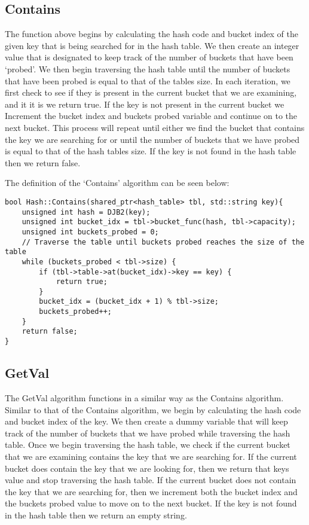 \subsection*{Contains}

The function above begins by calculating the hash code and bucket index of the given key that is being searched for in the hash table. We then create an integer value that is designated
to keep track of the number of buckets that have been `probed'. We then begin traversing the hash table until the number of buckets that have been probed is equal to that of the tables
size. In each iteration, we first check to see if they is present in the current bucket that we are examining, and it it is we return true. If the key is not present in the current bucket
we Increment the bucket index and buckets probed variable and continue on to the next bucket. This process will repeat until either we find the bucket that contains the key we are searching
for or until the number of buckets that we have probed is equal to that of the hash tables size. If the key is not found in the hash table then we return false.

\begin{highlight}

The definition of the `Contains' algorithm can be seen below:

\horizontalline

\begin{verbatim}
bool Hash::Contains(shared_ptr<hash_table> tbl, std::string key){
    unsigned int hash = DJB2(key);
    unsigned int bucket_idx = tbl->bucket_func(hash, tbl->capacity);
    unsigned int buckets_probed = 0;
    // Traverse the table until buckets probed reaches the size of the table
    while (buckets_probed < tbl->size) {
        if (tbl->table->at(bucket_idx)->key == key) {
            return true;
        }
        bucket_idx = (bucket_idx + 1) % tbl->size;
        buckets_probed++;
    }
    return false;
}
\end{verbatim}

\end{highlight}

\subsection*{GetVal}

The GetVal algorithm functions in a similar way as the Contains algorithm. Similar to that of the Contains algorithm, we begin by calculating the hash code and bucket index of the key. We then
create a dummy variable that will keep track of the number of buckets that we have probed while traversing the hash table. Once we begin traversing the hash table, we check if the current bucket
that we are examining contains the key that we are searching for. If the current bucket does contain the key that we are looking for, then we return that keys value and stop traversing the hash
table. If the current bucket does not contain the key that we are searching for, then we increment both the bucket index and the buckets probed value to move on to the next bucket. If the key is
not found in the hash table then we return an empty string.


